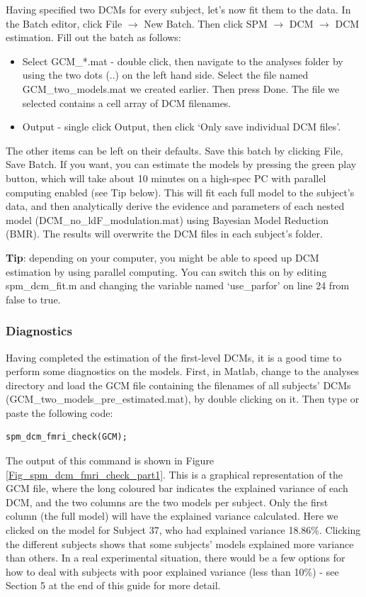 \documentclass{article}
\begin{document}
Having specified two DCMs for every subject, let's now fit them to the data. In the Batch editor, click File $\rightarrow$ New Batch. Then click SPM $\rightarrow$ DCM $\rightarrow$ DCM estimation. Fill out the batch as follows:

\begin{itemize}
    \item Select GCM\_*.mat - double click, then navigate to the analyses folder by using the two dots (..) on the left hand side. Select the file named GCM\_two\_models.mat we created earlier. Then press Done. The file we selected contains a cell array of DCM filenames. 
    \item Output - single click Output, then click `Only save individual DCM files'.
\end{itemize}

The other items can be left on their defaults. Save this batch by clicking File, Save Batch. If you want, you can estimate the models by pressing the green play button, which will take about 10 minutes on a high-spec PC with parallel computing enabled (see Tip below). This will fit each full model to the subject's data, and then analytically derive the evidence and parameters of each nested model (DCM\_no\_ldF\_modulation.mat) using Bayesian Model Reduction (BMR). The results will overwrite the DCM files in each subject's folder.

\textbf{Tip}: depending on your computer, you might be able to speed up DCM estimation by using parallel computing. You can switch this on by editing spm\_dcm\_fit.m and changing the variable named `use\_parfor' on line 24 from false to true.

\subsubsection{Diagnostics} \label{GUI_diagnostics}
Having completed the estimation of the first-level DCMs, it is a good time to perform some diagnostics on the models. First, in Matlab, change to the analyses directory and load the GCM file containing the filenames of all subjects' DCMs (GCM\_two\_models\_pre\_estimated.mat), by double clicking on it. Then type or paste the following code:

\begin{lstlisting}[style=Matlab-editor, caption=DCM for fMRI diagnostics]
spm_dcm_fmri_check(GCM);
\end{lstlisting}

The output of this command is shown in Figure \ref{Fig_spm_dcm_fmri_check_part1}. This is a graphical representation of the GCM file, where the long coloured bar indicates the explained variance of each DCM, and the two columns are the two models per subject. Only the first column (the full model) will have the explained variance calculated. Here we clicked on the model for Subject 37, who had explained variance 18.86\%. Clicking the different subjects shows that some subjects' models explained more variance than others. In a real experimental situation, there would be a few options for how to deal with subjects with poor explained variance (less than 10\%) - see Section 5 at the end of this guide for more detail.
\end{document}
